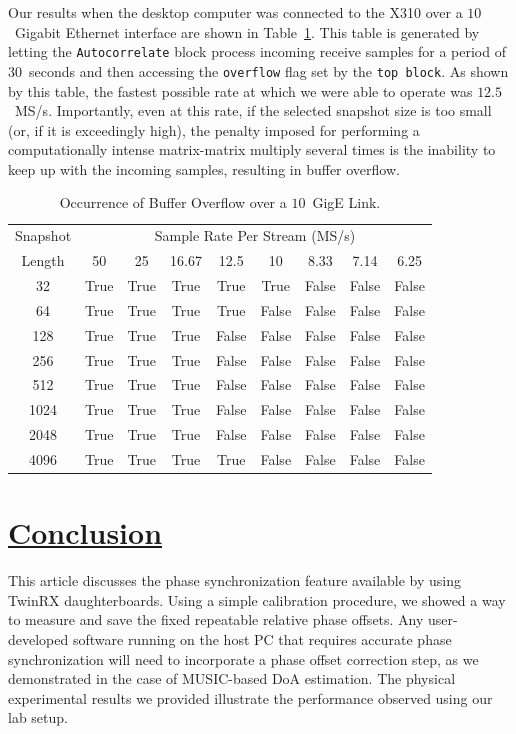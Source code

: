 \documentclass[a4paper, 11pt]{article}
\begin{document}
Our results when the desktop computer was connected to the X310 over a $10$~Gigabit Ethernet interface are shown in Table~\ref{benchmark_table_10gige_desktop}. This table is generated by letting the \texttt{Autocorrelate} block process incoming receive samples for a period of $30$~seconds and then accessing the \texttt{overflow} flag set by the \texttt{top block}. As shown by this table, the fastest possible rate at which we were able to operate was $12.5$~MS/s. Importantly, even at this rate, if the selected snapshot size is too small (or, if it is exceedingly high), the penalty imposed for performing a computationally intense matrix-matrix multiply several times is the inability to keep up with the incoming samples, resulting in buffer overflow. 
\begin{table}[t]
\caption{Occurrence of Buffer Overflow over a $10$~GigE Link.}
\begin{center}
\begin{tabular}{|c|c|c|c|c|c|c|c|c|}
\cline{1-9}
Snapshot & \multicolumn{8}{|c|}{Sample Rate Per Stream (MS/s)} \\
\cline{2-9}
Length& 50 & 25 & 16.67 & 12.5 & 10 & 8.33 & 7.14 & 6.25 \\
\hline
\multicolumn{1}{|c|}{32} & True & True & True & True & True & False & False & False\\
\multicolumn{1}{|c|}{64} & True & True & True & True & False & False & False & False\\
\multicolumn{1}{|c|}{128} & True & True & True & False & False & False & False & False\\
\multicolumn{1}{|c|}{256} & True & True & True & False & False & False & False & False\\
\multicolumn{1}{|c|}{512} & True & True & True & False & False & False & False & False\\
\multicolumn{1}{|c|}{1024} & True & True & True & False & False & False & False & False\\
\multicolumn{1}{|c|}{2048} & True & True & True & False & False & False & False & False\\
\multicolumn{1}{|c|}{4096} & True & True & True & True & False & False & False & False\\
\hline
\end{tabular}
\end{center}
\label{benchmark_table_10gige_desktop}
\end{table}

\section*{\underline{Conclusion}}
This article discusses the phase synchronization feature available by using TwinRX daughterboards. Using a simple calibration procedure, we showed a way to measure and save the fixed repeatable relative phase offsets. Any user-developed software running on the host PC that requires accurate phase synchronization will need to incorporate a phase offset correction step, as we demonstrated in the case of MUSIC-based DoA estimation. The physical experimental results we provided illustrate the performance observed using our lab setup. 
\end{document}
